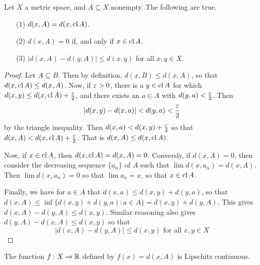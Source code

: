 \begin{lemma}\label{2.5.6}
    Let $X$ a metric space, and  $A \subseteq X$ nonempty. The following are
    true.
    \begin{enumerate}
        \item[(1)] $d(x,A)=d(x,\operatorname{cl}{A})$.

        \item[(2)] $d(x,A)=0$ if, and only if $x \in \operatorname{cl}{A}$.

        \item[(3)] $|d(x,A)-d(y,A)| \leq d(x,y)$ for all $x,y \in X$.
    \end{enumerate}
\end{lemma}
\begin{proof}
    Let $A \subseteq B$. Then by definition,  $d(x,B) \leq d(x,A)$, so that
    $d(x,\operatorname{cl}{A}) \leq d(x,A)$. Now, if $\varepsilon>0$, there is a  $y \in \operatorname{cl}{A}$ for
    which $d(x,y) \leq d(x,\operatorname{cl}{A})+\frac{\varepsilon}{2}$, and there exists an $a \in A$
    with  $d(y,a)<\frac{\varepsilon}{2}$. Then
    \begin{equation*}
        |d(x,y)-d(x,a)|<d(y,a)<\frac{\varepsilon}{2}
    \end{equation*}
    by the triangle inequality. Then $d(x,a)<d(x,y)+\frac{\varepsilon}{2}$ so that
    $d(x,A)<d(x,\operatorname{cl}{A})+\frac{\varepsilon}{2}$. That is $d(x,A) \leq d(x,\operatorname{cl}{A})$.

    Now, if $x \in \operatorname{cl}{A}$, then $d(x,\operatorname{cl}{A})=d(x,A)=0$. Conversly, if
    $d(x,A)=0$, then consider the decreasing sequence $\{a_n\}$ of $A$ such that
    $\lim{d(x,a_n)}=d(x,A)$. Then $\lim{d(x,a_n)}=0$ so that $\lim{a_n}=x$, so
    that $x \in \operatorname{cl}{A}$.

    Finally, we have for $a \in A$ that  $d(x,a) \leq d(x,y)+d(y,a)$, so that
    $d(x,A) \leq \inf{\{d(x,y)+d(y,a) : a \in A\}}=d(x,y)+d(y,A)$. This gives
    $d(x,A)-d(y,A) \leq d(x,y)$. Similar reasoning also gives $d(y,A)-d(x,A)
    \leq d(x,y)$ so that
    \begin{equation*}
        |d(x,A)-d(y,A)| \leq d(x,y) \text{ for all } x,y \in X
    \end{equation*}
\end{proof}
\begin{corollary}
    The function $f:X \xrightarrow{} \mathbb{R}$ defined by $f(x)=d(x,A)$ is Lipschitz
    continuous.
\end{corollary}

